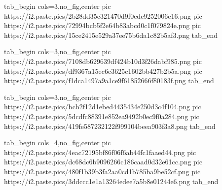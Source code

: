  
 
 
 
 
\zzSecCmtScr

\ifcmt
  tab_begin cols=3,no_fig,center
     pic https://i2.paste.pics/2b28dd35c321470d9f0edc9252006c16.png
		 pic https://i2.paste.pics/72994bcb5f2e64b83abcd0c1f079824e.png
		 pic https://i2.paste.pics/15ce2415e529a37ee75b6da1c82b5af3.png
  tab_end
\fi

\ifcmt
  tab_begin cols=3,no_fig,center
		pic https://i2.paste.pics/7108db629639df424b10d3f26dabf985.png
		pic https://i2.paste.pics/df9367a15ec6c3625c1602bb427b2b5a.png
		pic https://i2.paste.pics/f1dca1497a9a1ce9f61852666f80183f.png
  tab_end
\fi

\ifcmt
  tab_begin cols=3,no_fig,center
		pic https://i2.paste.pics/bcb2f12d1ebed4435434e250d3c4f104.png
		pic https://i2.paste.pics/5dcdfc88391e852ea9492b0ec9f0a284.png
		pic https://i2.paste.pics/419fe587232122f999104beea903f3a8.png
  tab_end
\fi

\ifcmt
  tab_begin cols=4,no_fig,center
		pic https://i2.paste.pics/4eac72195bf86f06f6ab44fc1faaed44.png
		pic https://i2.paste.pics/dc68dc6b9096266c186caad0d32e61cc.png
		pic https://i2.paste.pics/480f1b39b3fa2aa0cd1b785ba9be52cf.png
		pic https://i2.paste.pics/3ddccc1e1a13264edee7a5b8e01244e6.png
  tab_end
\fi
